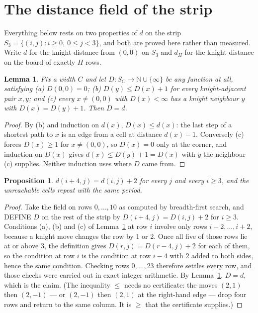 \documentclass[11pt,a4paper]{article}
\theoremstyle{plain}
\newtheorem{lemma}[theorem]{Lemma}
\newtheorem{proposition}[theorem]{Proposition}
\theoremstyle{definition}
\begin{document}
\section{The distance field of the strip}

Everything below rests on two properties of $d$ on the strip $S_{3}=\{(i,j): i\ge 0,\ 0\le j<3\}$, and both are proved here rather than measured. Write $d$ for the knight distance from $(0,0)$ on $S_{3}$ and $d_H$ for the knight distance on the board of exactly $H$ rows.

\begin{lemma}\label{lem:bellman}
Fix a width $C$ and let $D:S_C\to\mathbb{N}\cup\{\infty\}$ be any function at all, satisfying
(a) $D(0,0)=0$; (b) $D(y)\le D(x)+1$ for every knight-adjacent pair $x,y$; and
(c) every $x\ne(0,0)$ with $D(x)<\infty$ has a knight neighbour $y$ with $D(x)=D(y)+1$. Then $D=d$.
\end{lemma}

\begin{proof}
By (b) and induction on $d(x)$, $D(x)\le d(x)$: the last step of a shortest path to $x$ is an edge from a cell at distance $d(x)-1$. Conversely (c) forces $D(x)\ge1$ for $x\ne(0,0)$, so $D(x)=0$ only at the corner, and induction on $D(x)$ gives $d(x)\le D(y)+1=D(x)$ with $y$ the neighbour (c) supplies. Neither induction uses where $D$ came from.
\end{proof}

\begin{proposition}\label{prop:period}
$d(i+4,j)=d(i,j)+2$ for every $j$ and every $i\ge3$, and the unreachable cells repeat with the same period.
\end{proposition}

\begin{proof}
Take the field on rows $0,\dots,10$ as computed by breadth-first search, and DEFINE $D$ on the rest of the strip by $D(i+4,j)=D(i,j)+2$ for $i\ge3$. Conditions (a), (b) and (c) of Lemma~\ref{lem:bellman} at row $i$ involve only rows $i-2,\dots,i+2$, because a knight move changes the row by $1$ or $2$. Once all five of those rows lie at or above $3$, the definition gives $D(r,j)=D(r-4,j)+2$ for each of them, so the condition at row $i$ is the condition at row $i-4$ with $2$ added to both sides, hence the same condition. Checking rows $0,\dots,23$ therefore settles every row, and those checks were carried out in exact integer arithmetic. By Lemma~\ref{lem:bellman}, $D=d$, which is the claim. (The inequality $\le$ needs no certificate: the moves $(2,1)$ then $(2,-1)$ --- or $(2,-1)$ then $(2,1)$ at the right-hand edge --- drop four rows and return to the same column. It is $\ge$ that the certificate supplies.)
\end{proof}
\end{document}
